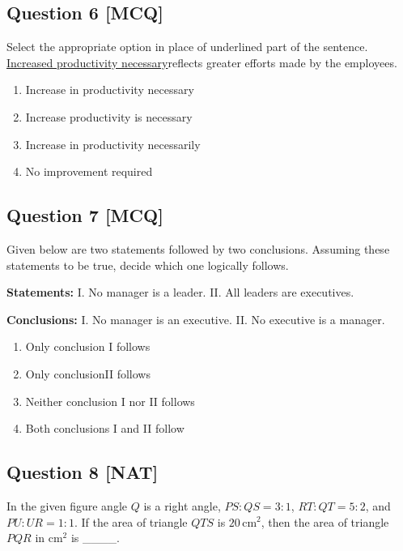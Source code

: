 \documentclass[12pt,a4paper]{article}
\begin{document}
\subsection*{Question 6 [MCQ]}
Select the appropriate option in place of underlined part of the sentence.
\underline{Increased productivity necessary}reflects greater efforts made by the employees.
\begin{enumerate}[label=(\alph*)]
\item Increase in productivity necessary
\item Increase productivity is necessary 
\item Increase in productivity necessarily
\item No improvement required
\end{enumerate}

\subsection*{Question 7 [MCQ]}
Given below are two statements followed by two conclusions. Assuming these statements to be true, decide which one logically follows.

\textbf{Statements:}
I. No manager is a leader.
II. All leaders are executives.

\textbf{Conclusions:}
I. No manager is an executive.
II. No executive is a manager.
\begin{enumerate}[label=(\alph*)]
\item Only conclusion I follows
\item Only conclusionII follows
\item Neither conclusion I nor II follows 
\item Both conclusions I and II follow
\end{enumerate}



\subsection*{Question 8 [NAT]}
\vspace{0.3cm}

In the given figure angle \( Q \) is a right angle, \( PS:QS = 3:1 \), \( RT:QT = 5:2 \), and \( PU:UR = 1:1 \). If the area of triangle \( QTS \) is \( 20 \, \text{cm}^2 \), then the area of triangle \( PQR \) in \( \text{cm}^2 \) is \_\_\_\_.

\vspace{0.5cm}
\end{document}
